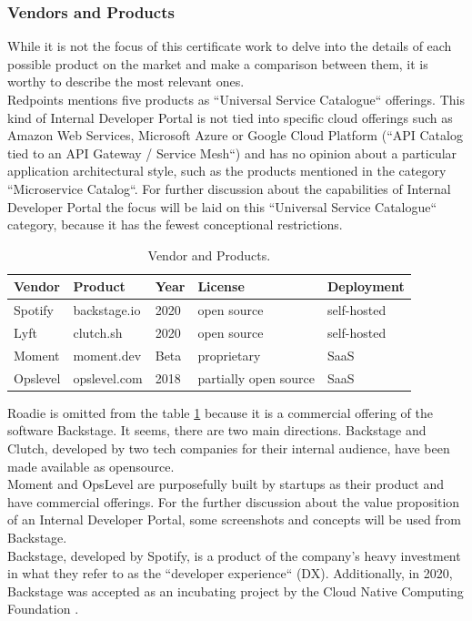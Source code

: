 \documentclass[a4paper,10pt]{article}
\begin{document}
    \subsubsection{Vendors and Products}
    \label{sssec:vendors}
    While it is not the focus of this certificate work to delve into the details of each possible product on the market
    and make a comparison between them, it is worthy to describe the most relevant ones.\\
    Redpoints mentions five products as ``Universal Service Catalogue`` offerings\parencite{devportalsprimer}.
    This kind of Internal Developer Portal is not tied into specific cloud offerings such as Amazon Web Services, Microsoft Azure or Google
    Cloud Platform (``API Catalog tied to an API Gateway / Service Mesh``) and has no opinion about a particular application
    architectural style, such as the products mentioned in the category ``Microservice Catalog``.
    For further discussion about the capabilities of Internal Developer Portal the focus will be laid on this
    ``Universal Service Catalogue`` category, because it has the fewest conceptional restrictions.\\
    \begin{table}[!htbp]
        \begin{center}
            \begin{tabularx}{\textwidth}{lllll}
                \toprule
                Vendor   & Product      & Year & License               & Deployment  \\
                \midrule
                Spotify  & backstage.io & 2020 & open source           & self-hosted \\
                Lyft     & clutch.sh    & 2020 & open source           & self-hosted \\
                Moment   & moment.dev   & Beta & proprietary           & SaaS        \\
                Opslevel & opslevel.com & 2018 & partially open source & SaaS        \\
                \bottomrule
            \end{tabularx}
            \caption{\label{tab:vendors} Vendor and Products.}
        \end{center}
    \end{table}
    \FloatBarrier
    Roadie is omitted from the table \ref{tab:vendors} because it is a commercial offering of the software Backstage.
    It seems, there are two main directions.
    Backstage and Clutch, developed by two tech companies for their internal audience, have been made
    available as opensource.\\
    Moment and OpsLevel are purposefully built by startups as their product and have commercial offerings.
    For the further discussion about the value proposition of an Internal Developer Portal, some screenshots and concepts will
    be used from Backstage.\\
    Backstage, developed by Spotify, is a product of the company's heavy investment in what they refer to as the
    ``developer experience`` (DX)\parencite{spotifydx}.
    Additionally, in 2020, Backstage was accepted as an incubating project by the Cloud Native Computing Foundation\parencite{cncf} .
\end{document}
